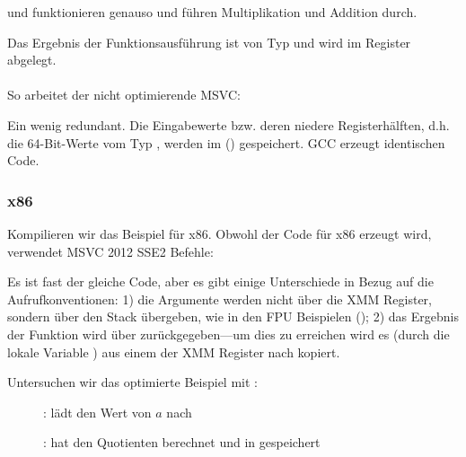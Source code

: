  und  funktionieren genauso und führen Multiplikation und Addition durch.

Das Ergebnis der Funktionsausführung ist von Typ \Tdouble und wird im  Register abgelegt.\\\\
So arbeitet der nicht optimierende MSVC:



Ein wenig redundant. Die Eingabewerte bzw. deren niedere Registerhälften, d.h. die 64-Bit-Werte vom Typ \Tdouble, werden
im () gespeichert.
GCC erzeugt identischen Code.

\subsubsection{x86}
Kompilieren wir das Beispiel für x86. Obwohl der Code für x86 erzeugt wird, verwendet MSVC 2012 SSE2 Befehle:




Es ist fast der gleiche Code, aber es gibt einige Unterschiede in Bezug auf die Aufrufkonventionen:
1) die Argumente werden nicht über die XMM Register, sondern über den Stack übergeben, wie in den FPU Beispielen
();
2) das Ergebnis der Funktion wird über  zurückgegeben---um dies zu erreichen wird es (durch die lokale Variable
) aus einem der XMM Register nach  kopiert.

\clearpage
Untersuchen wir das optimierte Beispiel mit \olly:

\begin{figure}[H]
\centering
{}
\caption{\olly:  lädt den Wert von $a$ nach }
\label{fig:FPU_SIMD_simple_olly1}
\end{figure}

\clearpage
\begin{figure}[H]
\centering
{}
\caption{\olly:  hat den Quotienten berechnet und in  gespeichert} 
\label{fig:FPU_SIMD_simple_olly2}
\end{figure}

